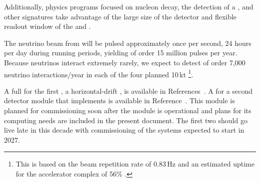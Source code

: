 \documentclass[../main-v1.tex]{subfiles}
\begin{document}
Additionally, physics programs focused on nucleon decay, the detection of a , and other  signatures take advantage of the large size of the detector and flexible readout window of the  and . %


The neutrino beam from  will be pulsed approximately once per second, 24 hours per day during running periods, %
yielding of order 15 million pulses per year.  Because neutrinos interact  extremely rarely, we expect to detect of order 7,000 neutrino interactions/year in each of the four planned 10\,kt %
\footnote{This is based on the beam repetition rate of 0.83\,Hz and an estimated uptime for the accelerator complex of 56\% \cite{Abi:2020evt}.}.


A full  for the first , a horizontal-drift ,
is available in References~\cite{DUNE:2020lwj, Abi:2020evt, Abi:2020oxb, Abi:2020loh}.  %
 A  for a second detector module that implements  is available in Reference~\cite{bib:spvd-cdr-edms}. This module is planned for commissioning soon after the  module is operational and plans for its computing needs are included in the present document. 
The first two  should go live late in this decade with commissioning of the  %
systems %
expected to start in 2027. %

\end{document}
